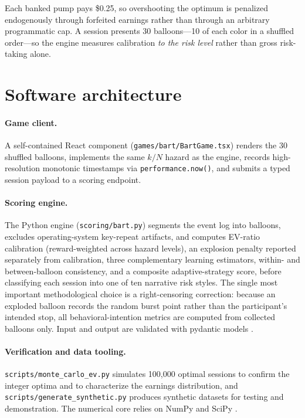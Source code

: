 \documentclass[11pt]{article}
\begin{document}
Each banked pump pays \$0.25, so overshooting the optimum is penalized
endogenously through forfeited earnings rather than through an arbitrary
programmatic cap. A session presents 30 balloons---10 of each color in a shuffled
order---so the engine measures calibration \emph{to the risk level} rather than
gross risk-taking alone.

\section{Software architecture}

\paragraph{Game client.} A self-contained React component
(\texttt{games/bart/BartGame.tsx}) renders the 30 shuffled balloons, implements the
same $k/N$ hazard as the engine, records high-resolution monotonic timestamps via
\texttt{performance.now()}, and submits a typed session payload to a scoring
endpoint.

\paragraph{Scoring engine.} The Python engine (\texttt{scoring/bart.py}) segments
the event log into balloons, excludes operating-system key-repeat artifacts, and
computes EV-ratio calibration (reward-weighted across hazard levels), an explosion
penalty reported separately from calibration, three complementary learning
estimators, within- and between-balloon consistency, and a composite
adaptive-strategy score, before classifying each session into one of ten narrative
risk styles. The single most important methodological choice is a right-censoring
correction: because an exploded balloon records the random burst point rather than
the participant's intended stop, all behavioral-intention metrics are computed
from collected balloons only. Input and output are validated with pydantic models
\citep{pydantic}.

\paragraph{Verification and data tooling.} \texttt{scripts/monte\_carlo\_ev.py}
simulates 100{,}000 optimal sessions to confirm the integer optima and to
characterize the earnings distribution, and \texttt{scripts/generate\_synthetic.py}
produces synthetic datasets for testing and demonstration. The numerical core
relies on NumPy \citep{harris2020} and SciPy \citep{virtanen2020}.
\end{document}
